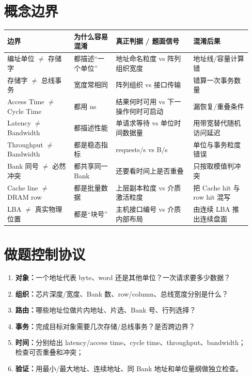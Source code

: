 \documentclass[UTF8,fontset=fandol,11pt,a4paper]{ctexart}
\newcommand{\kw}[1]{\textbf{\color{deep}#1}}\newcommand{\code}[1]{\texttt{#1}}
\begin{document}
\section{概念边界}
\begin{center}\small
\begin{tabularx}{\linewidth}{L{2.2cm}L{2.7cm}YY}
\toprule
边界 & 为什么容易混淆 & 真正判据 / 题面信号 & 混淆后果\\\midrule
编址单位 $\neq$ 存储字 & 都描述“一个单位” & 地址命名粒度 vs 阵列组织宽度 & 地址线/容量计算错\\
存储字 $\neq$ 总线事务 & 宽度常相同 & 阵列组织 vs 接口传输 & 错算一次事务数量\\
Access Time $\neq$ Cycle Time & 都用 ns & 结果何时可用 vs 下一操作何时可启动 & 漏恢复/重叠条件\\
Latency $\neq$ Bandwidth & 都描述性能 & 单请求等待 vs 单位时间数据量 & 用带宽替代随机访问延迟\\
Throughput $\neq$ Bandwidth & 都是稳态指标 & requests/s vs B/s & 单位与事务粒度错误\\
Bank 同号 $\neq$ 必然冲突 & 都共享同一 Bank & 还要看时间上是否重叠 & 只按取模值判冲突\\
Cache line $\neq$ DRAM row & 都是批量数据 & 上层副本粒度 vs 介质激活粒度 & 把 Cache hit 与 row hit 混写\\
LBA $\neq$ 真实物理位置 & 都是“块号” & 主机接口编号 vs 介质内部布局 & 由连续 LBA 推出连续盘面\\
\bottomrule
\end{tabularx}
\end{center}

\section{做题控制协议}
\begin{enumerate}
\item \kw{对象：}一个地址代表 byte、word 还是其他单位？一次请求要多少数据？
\item \kw{组织：}芯片深度/宽度、Bank 数、row/column、总线宽度分别是什么？
\item \kw{路由：}哪些地址位做片内地址、片选、Bank 号、行列选择？
\item \kw{事务：}完成目标对象需要几次存储/总线事务？是否跨边界？
\item \kw{时间：}分别给出 latency/access time、cycle time、throughput、bandwidth；检查可否重叠和冲突；
\item \kw{验证：}用最小/最大地址、连续地址、同 Bank 地址和单位量纲做独立检查。
\end{enumerate}
\end{document}
